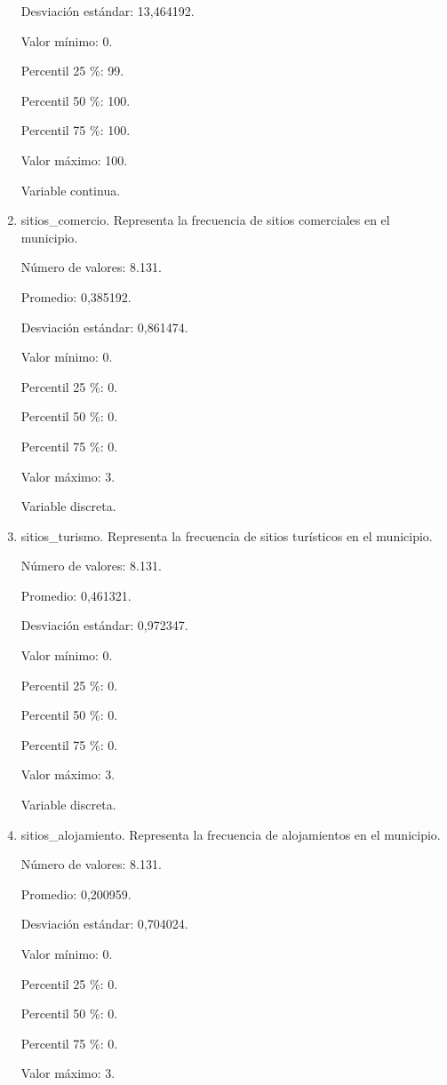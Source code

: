 \begin{enumerate}
	Desviación estándar: 13,464192.
	
	Valor mínimo: 0.
	
	Percentil 25 \%: 99.
	
	Percentil 50 \%: 100.
	
	Percentil 75 \%: 100.
	
	Valor máximo: 100.
	
	Variable continua.

	\item sitios\_comercio. Representa la frecuencia de sitios comerciales en el municipio.
	
	Número de valores: 8.131.
	
	Promedio: 0,385192.
	
	Desviación estándar: 0,861474.
	
	Valor mínimo: 0.
	
	Percentil 25 \%: 0.
	
	Percentil 50 \%: 0.
	
	Percentil 75 \%: 0.
	
	Valor máximo: 3.
	
	Variable discreta.

	\item sitios\_turismo. Representa la frecuencia de sitios turísticos en el municipio.
	
	Número de valores: 8.131.
	
	Promedio: 0,461321.
	
	Desviación estándar: 0,972347.
	
	Valor mínimo: 0.
	
	Percentil 25 \%: 0.
	
	Percentil 50 \%: 0.
	
	Percentil 75 \%: 0.
	
	Valor máximo: 3.
	
	Variable discreta.

	\item sitios\_alojamiento. Representa la frecuencia de alojamientos en el municipio.
	
	Número de valores: 8.131.
	
	Promedio: 0,200959.
	
	Desviación estándar: 0,704024.
	
	Valor mínimo: 0.
	
	Percentil 25 \%: 0.
	
	Percentil 50 \%: 0.
	
	Percentil 75 \%: 0.
	
	Valor máximo: 3.
	

\end{enumerate}
